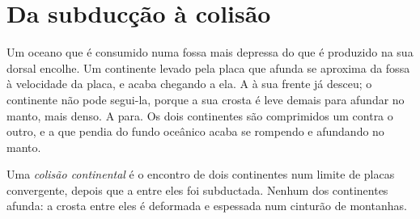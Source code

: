 \section{Da subducção à colisão}

Um oceano que é consumido numa fossa mais depressa do que é produzido na sua
dorsal encolhe. Um continente levado pela placa que afunda se aproxima da
fossa à velocidade da placa, e acaba chegando a ela. A  à
sua frente já desceu; o continente não pode segui-la, porque a sua crosta é
leve demais para afundar no manto, mais denso. A  para. Os dois
continentes são comprimidos um contra o outro, e a  que pendia do fundo
oceânico acaba se rompendo e afundando no manto.

\begin{definition}\label{def:g12:mountain-building:collision}
Uma \emph{colisão continental} é o encontro de
dois continentes num limite de placas convergente, depois que a  entre eles foi subductada. Nenhum dos continentes afunda: a crosta
entre eles é deformada e espessada num cinturão de montanhas.
\end{definition}

